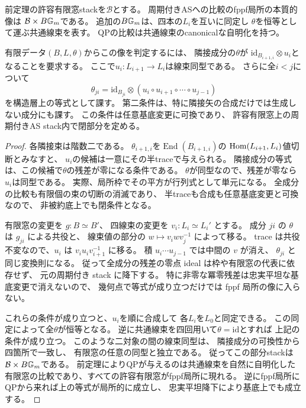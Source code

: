 \begin{corollary}[周期付き比較の飽和像]
\label{cor:qa-qp-marked-as-saturated-image}
前定理の許容有限窓stackを$\mathcal B$とする。
周期付きASへの比較のfppf局所の本質的像は
$\mathcal B\times B\mathbb G_m$である。
追加の$B\mathbb G_m$は、四本の$L_i$を互いに同定し
$\theta$を恒等として運ぶ共通線束を表す。
QPの比較は共通線束のcanonicalな自明化を持つ。

有限データ$(B,L,\theta)$からこの像を判定するには、
隣接成分の$\theta$が
$\mathrm{id}_{B_{i+1,i}}\otimes u_i$となることを要求する。
ここで$u_i:L_{i+1}\to L_i$は線束同型である。
さらに全$i<j$について
\[
 \theta_{ji}=\mathrm{id}_{B_{ji}}\otimes
                 (u_i\circ u_{i+1}\circ\cdots\circ u_{j-1})
\]
を構造層上の等式として課す。
第二条件は、特に隣接矢の合成だけでは生成しない成分にも課す。
この条件は任意基底変更に可換であり、
許容有限窓上の周期付きAS stack内で閉部分を定める。
\end{corollary}
\begin{proof}
各隣接束は階数二である。
$\theta_{i+1,i}$を$\operatorname{End}(B_{i+1,i})$の
$\operatorname{Hom}(L_{i+1},L_i)$値切断とみなすと、
$u_i$の候補は一意にその半traceで与えられる。
隣接成分の等式は、この候補で$\theta$の残差が零になる条件である。
$\theta$が同型なので、残差が零なら$u_i$は同型である。
実際、局所枠でその平方が行列式として単元になる。
全成分の比較も有限個の束の切断の消滅であり、
半traceも合成も任意基底変更と可換なので、
非被約底上でも閉条件となる。

有限窓の変更を $g:B\simeq B'$、
四線束の変更を $v_i:L_i\simeq L_i'$ とする。
成分 $ji$ の $\theta$ は $g_{ji}$ による共役と、
線束値の部分の $w\mapsto v_iwv_j^{-1}$ によって移る。
trace は共役不変なので、$u_i$ は
$v_iu_iv_{i+1}^{-1}$ に移る。
積 $u_i\cdots u_{j-1}$ では中間の $v$ が消え、
$\theta_{ji}$ と同じ変換則になる。
従って全成分の残差の零点 ideal は枠や有限窓の代表に依存せず、
元の周期付き stack に降下する。
特に非零な冪零残差は忠実平坦な基底変更で消えないので、
幾何点で等式が成り立つだけでは fppf 局所の像に入らない。

これらの条件が成り立つと、$u_i$を順に合成して
各$L_i$を$L_0$と同定できる。
この同定によって全$\theta$が恒等となる。
逆に共通線束を四回用いて$\theta=\mathrm{id}$とすれば
上記の条件が成り立つ。
このような二対象の間の線束同型は、
隣接成分の可換性から四箇所で一致し、
有限窓の任意の同型と独立である。
従ってこの部分stackは$\mathcal B\times B\mathbb G_m$である。
前定理によりQPが与えるのは共通線束を自然に自明化した
有限窓の比較であり、すべての許容有限窓がfppf局所に現れる。
逆にfppf局所にQPから来れば上の等式が局所的に成立し、
忠実平坦降下により基底上でも成立する。
\end{proof}

